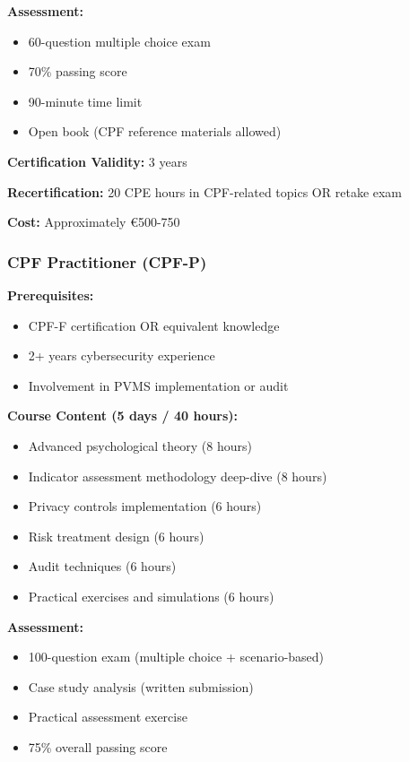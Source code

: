 \documentclass[11pt,a4paper]{article}
\begin{document}
\textbf{Assessment:}
\begin{itemize}
\item 60-question multiple choice exam
\item 70\% passing score
\item 90-minute time limit
\item Open book (CPF reference materials allowed)
\end{itemize}

\textbf{Certification Validity:} 3 years

\textbf{Recertification:} 20 CPE hours in CPF-related topics OR retake exam

\textbf{Cost:} Approximately €500-750

\subsubsection{CPF Practitioner (CPF-P)}

\textbf{Prerequisites:}
\begin{itemize}
\item CPF-F certification OR equivalent knowledge
\item 2+ years cybersecurity experience
\item Involvement in PVMS implementation or audit
\end{itemize}

\textbf{Course Content (5 days / 40 hours):}

\begin{itemize}
\item Advanced psychological theory (8 hours)
\item Indicator assessment methodology deep-dive (8 hours)
\item Privacy controls implementation (6 hours)
\item Risk treatment design (6 hours)
\item Audit techniques (6 hours)
\item Practical exercises and simulations (6 hours)
\end{itemize}

\textbf{Assessment:}
\begin{itemize}
\item 100-question exam (multiple choice + scenario-based)
\item Case study analysis (written submission)
\item Practical assessment exercise
\item 75\% overall passing score
\end{itemize}
\end{document}
